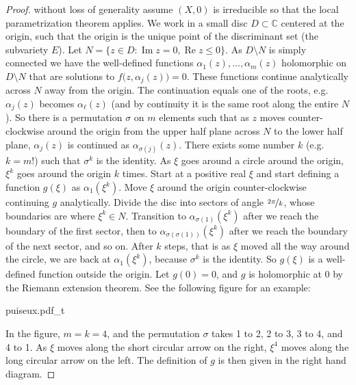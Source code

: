 \documentclass[12pt,openany]{book}
\renewcommand{\Re}{\operatorname{Re}}
\renewcommand{\Im}{\operatorname{Im}}
\newcommand{\C}{{\mathbb{C}}}
\theoremstyle{plain}
\theoremstyle{remark}
\theoremstyle{definition}
\newenvironment{myfig}{%
    \begin{center}
}{%
    \end{center}
}
\theoremstyle{exercise}
\theoremstyle{example}
\begin{document}
\begin{proof}
without loss of generality
assume $(X,0)$
is irreducible so that
the local parametrization theorem applies.
We work in a small disc $D \subset \C$ centered at the origin, such that the
origin is the unique point of the discriminant set (the subvariety
$E$).  Let $N = \{ z \in D : \Im z = 0 , \Re z \leq 0 \}$.
As $D \setminus N$ is simply connected we have the well-defined functions
$\alpha_1(z),\ldots,\alpha_m(z)$ holomorphic on $D \setminus N$
that are solutions to $f\bigl(z,\alpha_j(z)\bigr) = 0$.
These functions continue analytically across $N$ away from the
origin.  The continuation equals one of the roots, e.g.\ $\alpha_j(z)$
becomes $\alpha_\ell(z)$ (and by continuity it is the
same root along the entire $N$).  So there is
a permutation $\sigma$ on $m$ elements such that as $z$ moves
counter-clockwise around the origin from the upper half plane across $N$ to the lower half
plane, $\alpha_j(z)$ is continued as $\alpha_{\sigma(j)}(z)$.
There exists some number $k$ (e.g.\ $k=m!$) such that $\sigma^k$ is the identity.
As $\xi$ goes around
a circle around the origin, $\xi^k$ goes around the origin $k$ times.
Start at a positive real $\xi$ and start defining a
function $g(\xi)$ as
$\alpha_1(\xi^k)$.
Move $\xi$ around the origin counter-clockwise continuing $g$ analytically.
Divide the disc into sectors of angle $\nicefrac{2\pi}{k}$,
whose boundaries are where $\xi^k \in N$.
Transition to $\alpha_{\sigma(1)}(\xi^k)$ after we reach the boundary
of the first sector, then to
$\alpha_{\sigma(\sigma(1))}(\xi^k)$ after we reach the boundary of the next sector, and so on.
After $k$ steps, that is as
$\xi$ moved all the way around the circle,
we are back at $\alpha_1(\xi^k)$,
because
$\sigma^k$ is the identity.
So $g(\xi)$ is a well-defined function outside the origin.  Let
$g(0) = 0$, and $g$ is holomorphic at 0 by the Riemann extension theorem.
See the following figure for an example:

\begin{myfig}
{puiseux.pdf_t}
\end{myfig}

In the figure, $m = k = 4$, and the permutation $\sigma$ takes 1 to 2, 2 to 3, 3 to 4,
and 4 to 1.  As $\xi$ moves along the short circular arrow on the right, $\xi^4$
moves along the long circular arrow on the left.  The definition of $g$ is
then given in the right hand diagram.
\end{proof}
\end{document}

